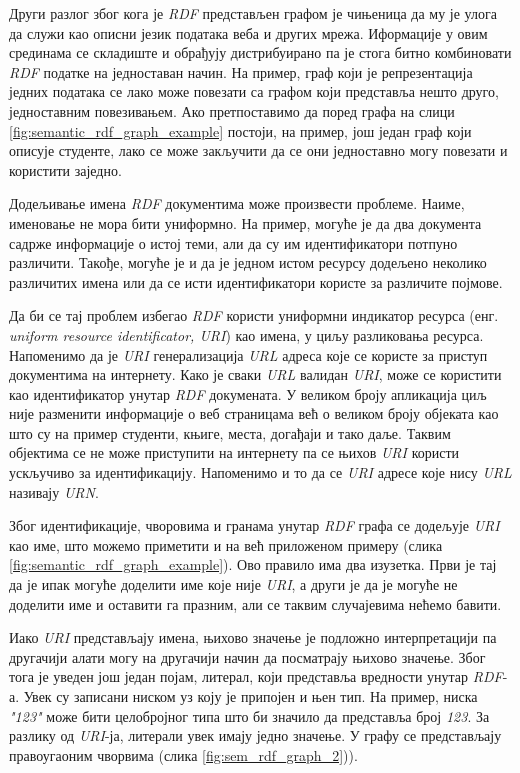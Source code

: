 \documentclass[12pt,oneside]{memoir}
\begin{document}
Други разлог због кога је \textit{RDF} представљен графом је чињеница да му је улога да служи као описни језик података веба и других мрежа. Иформације у овим срединама се складиште и обрађују дистрибуирано па је стога битно комбиновати \textit{RDF} податке на једноставан начин. На пример, граф који је репрезентација једних података се лако може повезати са графом који представља нешто друго, једноставним повезивањем. Ако претпоставимо да поред графа на слици \ref{fig:semantic_rdf_graph_example} постоји, на пример, још један граф који описује студенте, лако се може закључити да се они једноставно могу повезати и користити заједно. \cite{semantic}

Додељивање имена \textit{RDF} документима може произвести проблеме. Наиме, именовање не мора бити униформно. На пример, могуће је да два документа садрже информације о истој теми, али да су им идентификатори потпуно различити. Такође, могуће је и да је једном истом ресурсу додељено неколико различитих имена или да се исти идентификатори користе за различите појмове.

Да би се тај проблем избегао \textit{RDF} користи униформни индикатор ресурса (енг. \textit{uniform resource identificator, URI}) као имена, у циљу разликовања ресурса. Напоменимо да је \textit{URI} генерализација \textit{URL} адреса које се користе за приступ документима на интернету. Како је сваки \textit{URL} валидан \textit{URI}, може се користити као идентификатор унутар \textit{RDF} докумената. У великом броју апликација циљ није разменити информације о веб страницама већ о великом броју објеката као што су на пример студенти, књиге, места, догађаји и тако даље. Таквим објектима се не може приступити на интернету па се њихов \textit{URI} користи ускључиво за идентификацију. Напоменимо и то да се \textit{URI} адресе које нису \textit{URL} називају \textit{URN}. \cite{semantic}

Због идентификације, чворовима и гранама унутар \textit{RDF} графа се додељује \textit{URI} као име, што можемо приметити и на већ приложеном примеру (слика \ref{fig:semantic_rdf_graph_example}). Ово правило има два изузетка. Први је тај да је ипак могуће доделити име које није \textit{URI}, а други је да је могуће не доделити име и оставити га празним, али се таквим случајевима нећемо бавити. \cite{semantic}

Иако \textit{URI} представљају имена, њихово значење је подложно интерпретацији па другачији алати могу на другачији начин да посматрају њихово значење. Због тога је уведен још један појам, литерал, који представља вредности унутар \textit{RDF}-а. Увек су записани ниском уз коју је припојен и њен тип. На пример, ниска \textit{"123"} може бити целобројног типа што би значило да представља број \textit{123}. За разлику од \textit{URI}-ја, литерали увек имају једно значење. У графу се представљају правоугаоним чворвима (слика \ref{fig:sem_rdf_graph_2})). \cite{semantic}
\end{document}
